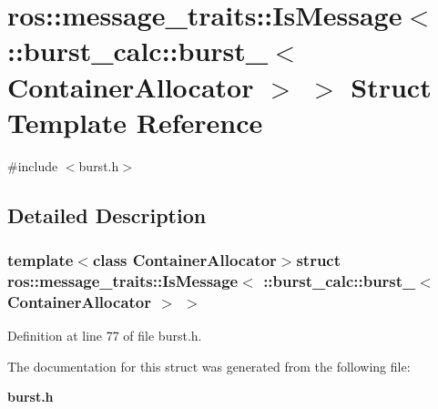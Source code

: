 \section{ros\-:\-:message\-\_\-traits\-:\-:\-Is\-Message$<$ \-:\-:burst\-\_\-calc\-:\-:burst\-\_\-$<$ \-Container\-Allocator $>$ $>$ \-Struct \-Template \-Reference}
\label{structros_1_1message__traits_1_1IsMessage_3_01_1_1burst__calc_1_1burst___3_01ContainerAllocator_01_4_01_4}


{\ttfamily \#include $<$burst.\-h$>$}



\subsection{\-Detailed \-Description}
\subsubsection*{template$<$class Container\-Allocator$>$struct ros\-::message\-\_\-traits\-::\-Is\-Message$<$ \-::burst\-\_\-calc\-::burst\-\_\-$<$ Container\-Allocator $>$ $>$}



\-Definition at line 77 of file burst.\-h.



\-The documentation for this struct was generated from the following file\-:\begin{DoxyCompactItemize}
\item 
{\bf burst.\-h}\end{DoxyCompactItemize}
